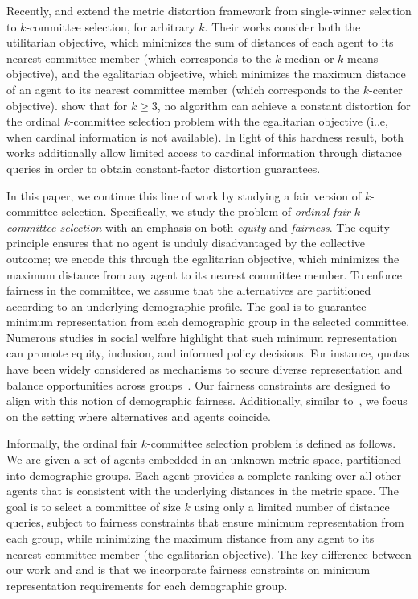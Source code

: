 \documentclass{article}
\begin{document}
Recently, \citet{pulyassary2025constant} and \citet{burkhardt2024low} extend the metric distortion framework from single-winner selection to $k$-committee selection, for arbitrary $k$. 
Their works consider both the utilitarian objective, which minimizes the sum of distances of each agent to its nearest committee member (which corresponds to the $k$-median or $k$-means objective), and the egalitarian objective, which minimizes the maximum distance of an agent to its nearest committee member (which corresponds to the $k$-center objective).
\citet{burkhardt2024low} show that for $k \geq 3$, no algorithm can achieve a constant distortion for the ordinal $k$-committee selection problem with the egalitarian objective (i..e, when cardinal information is not available).
In light of this hardness result, both works additionally allow limited access to cardinal information through distance queries in order to obtain constant-factor distortion guarantees.



In this paper, we continue this line of work by studying a fair version of $k$-committee selection. 
Specifically, we study the problem of \emph{ordinal fair $k$-committee selection} with an emphasis on both \emph{equity} and \emph{fairness}. 
The equity principle ensures that no agent is unduly disadvantaged by the collective outcome; we encode this through the egalitarian objective, which minimizes the maximum distance from any agent to its nearest committee member.
To enforce fairness in the committee, we assume that the alternatives are partitioned according to an underlying demographic profile. The goal is to guarantee minimum representation from each demographic group in the selected committee. Numerous studies in social welfare highlight that such minimum representation can promote equity, inclusion, and informed policy decisions. For instance, quotas have been widely considered as mechanisms to secure diverse representation and balance opportunities across groups~\cite{barnes2020gender, croissant2019ethnic}. Our fairness constraints are designed to align with this notion of demographic fairness. Additionally, similar to~\cite{burkhardt2024low,cembrano2025metric}, we focus on the setting where alternatives and agents coincide.


Informally, the ordinal fair $k$-committee selection problem is defined as follows. 
We are given a set of agents embedded in an unknown metric space, partitioned into demographic groups. 
Each agent provides a complete ranking over all other agents that is consistent with the underlying distances in the metric space.
The goal is to select a committee of size $k$ using only a limited number of distance queries, subject to fairness constraints that ensure minimum representation from each group, while minimizing the maximum distance from any agent to its nearest committee member (the egalitarian objective).
The key difference between our work and \citet{pulyassary2025constant} and \citet{burkhardt2024low} is that we incorporate fairness constraints on minimum representation requirements for each demographic group.
\end{document}
